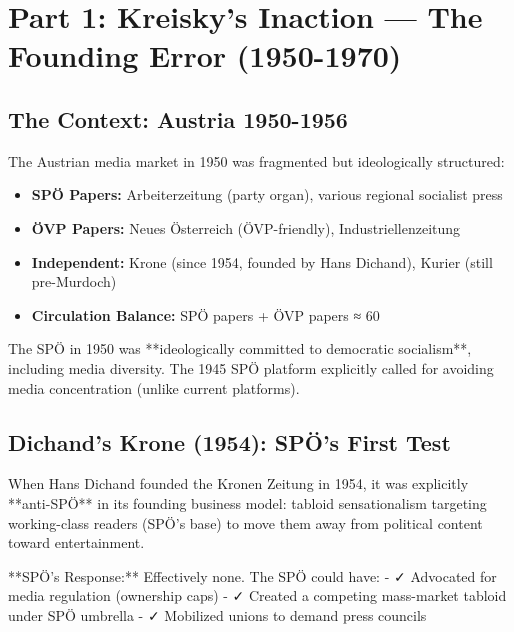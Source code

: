 
\section*{Part 1: Kreisky's Inaction --- The Founding Error (1950-1970)}

\subsection*{The Context: Austria 1950-1956}

The Austrian media market in 1950 was fragmented but ideologically structured:

\begin{itemize}
\item \textbf{SPÖ Papers:} Arbeiterzeitung (party organ), various regional socialist press
\item \textbf{ÖVP Papers:} Neues Österreich (ÖVP-friendly), Industriellenzeitung
\item \textbf{Independent:} Krone (since 1954, founded by Hans Dichand), Kurier (still pre-Murdoch)
\item \textbf{Circulation Balance:} SPÖ papers + ÖVP papers ≈ 60%
\end{itemize}

The SPÖ in 1950 was **ideologically committed to democratic socialism**, including media diversity.
The 1945 SPÖ platform explicitly called for avoiding media concentration (unlike current platforms).

\subsection*{Dichand's Krone (1954): SPÖ's First Test}

When Hans Dichand founded the Kronen Zeitung in 1954, it was explicitly **anti-SPÖ** in its founding
business model: tabloid sensationalism targeting working-class readers (SPÖ's base) to move them away
from political content toward entertainment.

**SPÖ's Response:** Effectively none. The SPÖ could have:
- ✓ Advocated for media regulation (ownership caps)
- ✓ Created a competing mass-market tabloid under SPÖ umbrella
- ✓ Mobilized unions to demand press councils

